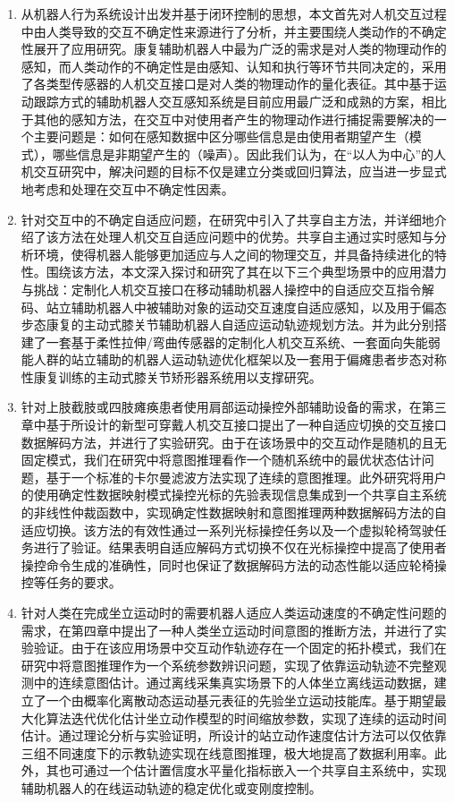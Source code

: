 \begin{enumerate}
\item 从机器人行为系统设计出发并基于闭环控制的思想，本文首先对人机交互过程中由人类导致的交互不确定性来源进行了分析，并主要围绕人类动作的不确定性展开了应用研究。康复辅助机器人中最为广泛的需求是对人类的物理动作的感知，而人类动作的不确定性是由感知、认知和执行等环节共同决定的，采用了各类型传感器的人机交互接口是对人类的物理动作的量化表征。其中基于运动跟踪方式的辅助机器人交互感知系统是目前应用最广泛和成熟的方案，相比于其他的感知方法，在交互中对使用者产生的物理动作进行捕捉需要解决的一个主要问题是：如何在感知数据中区分哪些信息是由使用者期望产生（模式），哪些信息是非期望产生的（噪声）。因此我们认为，在``以人为中心''的人机交互研究中，解决问题的目标不仅是建立分类或回归算法，应当进一步显式地考虑和处理在交互中不确定性因素。

\item 针对交互中的不确定自适应问题，在研究中引入了共享自主方法，并详细地介绍了该方法在处理人机交互自适应问题中的优势。共享自主通过实时感知与分析环境，使得机器人能够更加适应与人之间的物理交互，并具备持续进化的特性。围绕该方法，本文深入探讨和研究了其在以下三个典型场景中的应用潜力与挑战：定制化人机交互接口在移动辅助机器人操控中的自适应交互指令解码、站立辅助机器人中被辅助对象的运动交互速度自适应感知，以及用于偏态步态康复的主动式膝关节辅助机器人自适应运动轨迹规划方法。并为此分别搭建了一套基于柔性拉伸/弯曲传感器的定制化人机交互系统、一套面向失能弱能人群的站立辅助的机器人运动轨迹优化框架以及一套用于偏瘫患者步态对称性康复训练的主动式膝关节矫形器系统用以支撑研究。

\item 针对上肢截肢或四肢瘫痪患者使用肩部运动操控外部辅助设备的需求，在第三章中基于所设计的新型可穿戴人机交互接口提出了一种自适应切换的交互接口数据解码方法，并进行了实验研究。由于在该场景中的交互动作是随机的且无固定模式，我们在研究中将意图推理看作一个随机系统中的最优状态估计问题，基于一个标准的卡尔曼滤波方法实现了连续的意图推理。此外研究将用户的使用确定性数据映射模式操控光标的先验表现信息集成到一个共享自主系统的非线性仲裁函数中，实现确定性数据映射和意图推理两种数据解码方法的自适应切换。该方法的有效性通过一系列光标操控任务以及一个虚拟轮椅驾驶任务进行了验证。结果表明自适应解码方式切换不仅在光标操控中提高了使用者操控命令生成的准确性，同时也保证了数据解码方法的动态性能以适应轮椅操控等任务的要求。

\item 针对人类在完成坐立运动时的需要机器人适应人类运动速度的不确定性问题的需求，在第四章中提出了一种人类坐立运动时间意图的推断方法，并进行了实验验证。由于在该应用场景中交互动作轨迹存在一个固定的拓扑模式，我们在研究中将意图推理作为一个系统参数辨识问题，实现了依靠运动轨迹不完整观测中的连续意图估计。通过离线采集真实场景下的人体坐立离线运动数据，建立了一个由概率化离散动态运动基元表征的先验坐立运动技能库。基于期望最大化算法迭代优化估计坐立动作模型的时间缩放参数，实现了连续的运动时间估计。通过理论分析与实验证明，所设计的站立动作速度估计方法可以仅依靠三组不同速度下的示教轨迹实现在线意图推理，极大地提高了数据利用率。此外，其也可通过一个估计置信度水平量化指标嵌入一个共享自主系统中，实现辅助机器人的在线运动轨迹的稳定优化或变刚度控制。


\end{enumerate}
